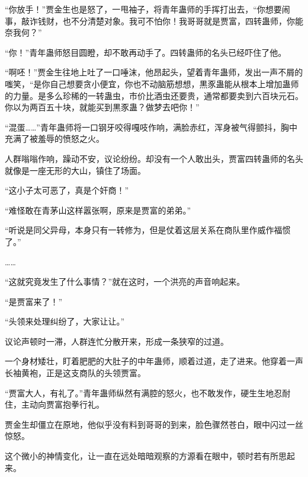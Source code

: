 \begin{this_body}
“你放手！”贾金生也是怒了，一甩袖子，将青年蛊师的手挥打出去，“你想要闹事，敲诈钱财，也不分清楚对象。我可不怕你！我哥哥就是贾富，四转蛊师，你能奈我何？”

“你！”青年蛊师怒目圆瞪，却不敢再动手了。四转蛊师的名头已经吓住了他。

“啊呸！”贾金生往地上吐了一口唾沫，他昂起头，望着青年蛊师，发出一声不屑的嗤笑，“是你自己想要贪小便宜，你也不动脑筋想想，黒豕蛊能从根本上增加蛊师的力量。是多么珍稀的一转蛊虫，市价比酒虫还要贵，通常都要卖到六百块元石。你以为两百五十块，就能买到黒豕蛊？做梦去吧你！”

“混蛋……”青年蛊师将一口钢牙咬得嘎吱作响，满脸赤红，浑身被气得颤抖，胸中充满了被羞辱的愤怒之火。

人群嗡嗡作响，躁动不安，议论纷纷。却没有一个人敢出头，贾富四转蛊师的名头就像是一座无形的大山，镇住了场面。

“这小子太可恶了，真是个奸商！”

“难怪敢在青茅山这样嚣张啊，原来是贾富的弟弟。”

“听说是同父异母，本身只有一转修为，但是仗着这层关系在商队里作威作福惯了。”

……

“这就究竟发生了什么事情？”就在这时，一个洪亮的声音响起来。

“是贾富来了！”

“头领来处理纠纷了，大家让让。”

议论声顿时一滞，人群连忙分散开来，形成一条狭窄的过道。

一个身材矮壮，盯着肥肥的大肚子的中年蛊师，顺着过道，走了进来。他穿着一声长袖黄袍，正是这支商队的头领贾富。

“贾富大人，有礼了。”青年蛊师纵然有满腔的怒火，也不敢发作，硬生生地忍耐住，主动向贾富抱拳行礼。

贾金生却僵立在原地，他似乎没有料到哥哥的到来，脸色骤然苍白，眼中闪过一丝惊怒。

这个微小的神情变化，让一直在远处暗暗观察的方源看在眼中，顿时若有所思起来。

\end{this_body}

